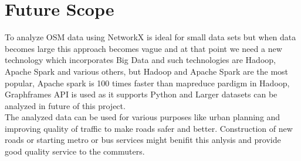 
\section{Future Scope}
To analyze OSM data using NetworkX is ideal for small data sets but when data becomes large this approach becomes vague and at that point we need a new technology which incorporates Big Data and such technologies are Hadoop, Apache Spark and various others, but Hadoop and Apache Spark are the most popular, Apache spark is 100 times faster than mapreduce pardigm in Hadoop, Graphframes API is used as it supports Python and Larger datasets can be analyzed in future of this project.\\
The analyzed data can be used for various purposes like urban planning and improving quality of traffic to make roads safer and better. Construction of new roads or starting metro or bus services might benifit this anlysis and provide good quality service to the commuters.



